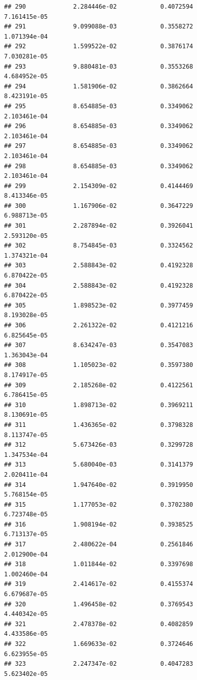 \documentclass[
]{article}
\begin{document}
\begin{verbatim}
## 290             2.284446e-02            0.4072594            7.161415e-05
## 291             9.099088e-03            0.3558272            1.071394e-04
## 292             1.599522e-02            0.3876174            7.030281e-05
## 293             9.880481e-03            0.3553268            4.684952e-05
## 294             1.581906e-02            0.3862664            8.423191e-05
## 295             8.654885e-03            0.3349062            2.103461e-04
## 296             8.654885e-03            0.3349062            2.103461e-04
## 297             8.654885e-03            0.3349062            2.103461e-04
## 298             8.654885e-03            0.3349062            2.103461e-04
## 299             2.154309e-02            0.4144469            8.413346e-05
## 300             1.167906e-02            0.3647229            6.988713e-05
## 301             2.287894e-02            0.3926041            2.593120e-05
## 302             8.754845e-03            0.3324562            1.374321e-04
## 303             2.588843e-02            0.4192328            6.870422e-05
## 304             2.588843e-02            0.4192328            6.870422e-05
## 305             1.898523e-02            0.3977459            8.193028e-05
## 306             2.261322e-02            0.4121216            6.825645e-05
## 307             8.634247e-03            0.3547083            1.363043e-04
## 308             1.105023e-02            0.3597380            8.174917e-05
## 309             2.185268e-02            0.4122561            6.786415e-05
## 310             1.898713e-02            0.3969211            8.130691e-05
## 311             1.436365e-02            0.3798328            8.113747e-05
## 312             5.673426e-03            0.3299728            1.347534e-04
## 313             5.680040e-03            0.3141379            2.020411e-04
## 314             1.947640e-02            0.3919950            5.768154e-05
## 315             1.177053e-02            0.3702380            6.723748e-05
## 316             1.908194e-02            0.3938525            6.713137e-05
## 317             2.480622e-04            0.2561846            2.012900e-04
## 318             1.011844e-02            0.3397698            1.002460e-04
## 319             2.414617e-02            0.4155374            6.679687e-05
## 320             1.496458e-02            0.3769543            4.440342e-05
## 321             2.478378e-02            0.4082859            4.433586e-05
## 322             1.669633e-02            0.3724646            6.623955e-05
## 323             2.247347e-02            0.4047283            5.623402e-05

\end{verbatim}
\end{document}
